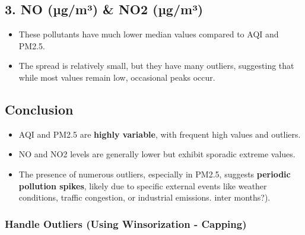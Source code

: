 \documentclass[11pt]{article}
\providecommand{\tightlist}{%
      \setlength{\itemsep}{0pt}\setlength{\parskip}{0pt}}
\begin{document}
\hypertarget{no-uxb5gmuxb3-no2-uxb5gmuxb3}{%
\subsection{\texorpdfstring{\textbf{3. NO (µg/m³) \& NO2
(µg/m³)}}{3. NO (µg/m³) \& NO2 (µg/m³)}}\label{no-uxb5gmuxb3-no2-uxb5gmuxb3}}

\begin{itemize}
\tightlist
\item
  These pollutants have much lower median values compared to AQI and
  PM2.5.
\item
  The spread is relatively small, but they have many outliers,
  suggesting that while most values remain low, occasional peaks occur.
\end{itemize}

\hypertarget{conclusion}{%
\subsection{\texorpdfstring{\textbf{Conclusion}}{Conclusion}}\label{conclusion}}

\begin{itemize}
\tightlist
\item
  AQI and PM2.5 are \textbf{highly variable}, with frequent high values
  and outliers.
\item
  NO and NO2 levels are generally lower but exhibit sporadic extreme
  values.
\item
  The presence of numerous outliers, especially in PM2.5, suggests
  \textbf{periodic pollution spikes}, likely due to specific external
  events like weather conditions, traffic congestion, or industrial
  emissions. inter months?).
\end{itemize}

    \hypertarget{handle-outliers-using-winsorization---capping}{%
\subsubsection{Handle Outliers (Using Winsorization -
Capping)}\label{handle-outliers-using-winsorization---capping}}
\end{document}
